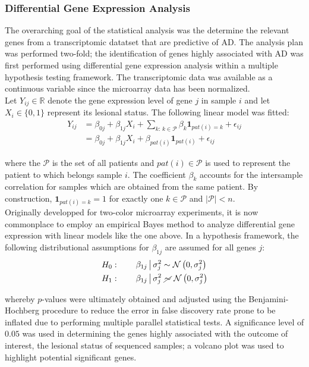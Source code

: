 \documentclass[journal, a4paper]{IEEEtran}
\def\one{\mathbf{1}}
\begin{document}
\subsubsection{Differential Gene Expression Analysis}

The overarching goal of the statistical analysis was the determine the relevant genes from a transcriptomic datatset that are predictive of AD. The analysis plan was performed two-fold; the identification of genes highly associated with AD was first performed using differential gene expression analysis within a multiple hypothesis testing framework. The transcriptomic data was available as a continuous variable since the microarray data has been normalized.\\

Let $Y_{ij} \in \mathbb{R}$ denote the gene expression level of gene $j$ in sample $i$ and let $X_i \in \{0, 1\}$ represent its lesional status. The following linear model was fitted:
\begin{align*}
  Y_{ij} &= \beta_{0j} + \beta_{1j}X_i + \sum_{k:\,k\in\mathcal{P}}\beta_{k}\one_{pat(i) = k} + \epsilon_{ij}\\
  &=\beta_{0j} + \beta_{1j}X_i + \beta_{pat(i)}\one_{pat(i)} + \epsilon_{ij}
\end{align*}

where the $\mathcal{P}$ is the set of all patients and $pat(i) \in \mathcal{P}$ is used to represent the patient to which belongs sample $i$. The coefficient $\beta_k$ accounts for the intersample correlation for samples which are obtained from the same patient. By construction, $\one_{pat(i) = k} = 1$ for exactly one $k \in \mathcal{P}$ and $\big\vert \mathcal{P}\big\vert < n$.\\

Originally developped for two-color microarray experiments, it is now commonplace to employ an empirical Bayes method to analyze differential gene expression with linear models like the one above\cite{smyth2004linear}. In a hypothesis framework, the following distributional assumptions for $\beta_{1j}$ are assumed for all genes $j$:
\begin{align*}
  H_0:\qquad \beta_{1j} \,\big\vert\, \sigma^2_j &\sim \mathcal{N}\left(0, \sigma^2_j\right)\\
  H_1:\qquad \beta_{1j} \,\big\vert\, \sigma^2_j &\,\,\cancel{\sim}\,\, \mathcal{N}\left(0, \sigma^2_j\right)
\end{align*}

whereby $p$-values were ultimately obtained and adjusted using the Benjamini-Hochberg procedure to reduce the error in false discovery rate prone to be inflated due to performing multiple parallel statistical tests\cite{benjamini2010discovering}. A significance level of $0.05$ was used in determining the genes highly associated with the outcome of interest, the lesional status of sequenced samples; a volcano plot was used to highlight potential significant genes.\\
\end{document}
